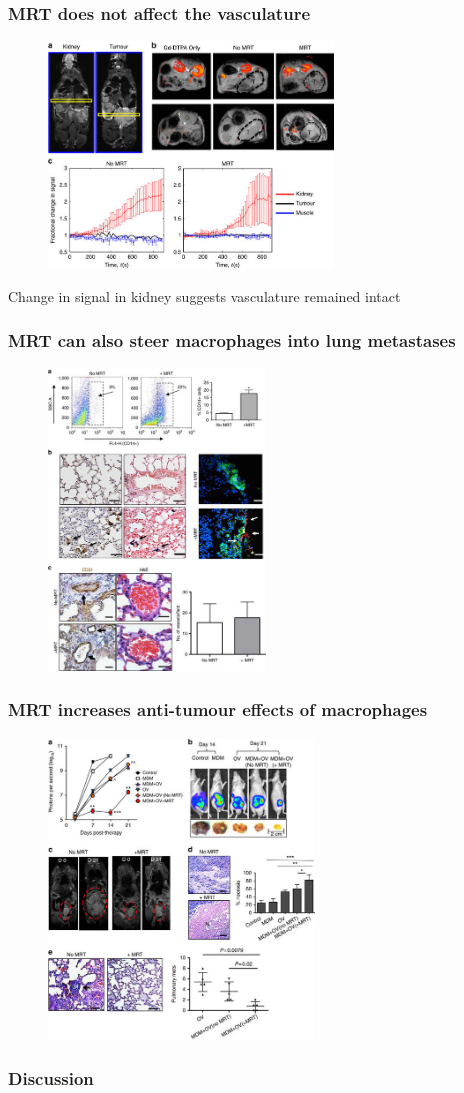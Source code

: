 \documentclass[8pt,xcolor=table]{beamer}
\begin{document}
\begin{frame}
\frametitle{MRT does not affect the vasculature}
 \begin{figure}
 \centering
 \includegraphics[height=6cm]{muthana_fig3_res}
 \end{figure} 
 
Change in signal in kidney suggests vasculature remained intact
 
\end{frame}

\begin{frame}
\frametitle{MRT can also steer macrophages into lung metastases}
 \begin{figure}
 \centering
 \includegraphics[height=8cm]{muthana_fig4_res}
 \end{figure} 
\end{frame}

\begin{frame}
\frametitle{MRT increases anti-tumour effects of macrophages}
 \begin{figure}
 \centering
 \includegraphics[height=8cm]{muthana_fig5_res}
 \end{figure} 
\end{frame}

\begin{frame}
\frametitle{Discussion}



\end{frame}
\end{document}
